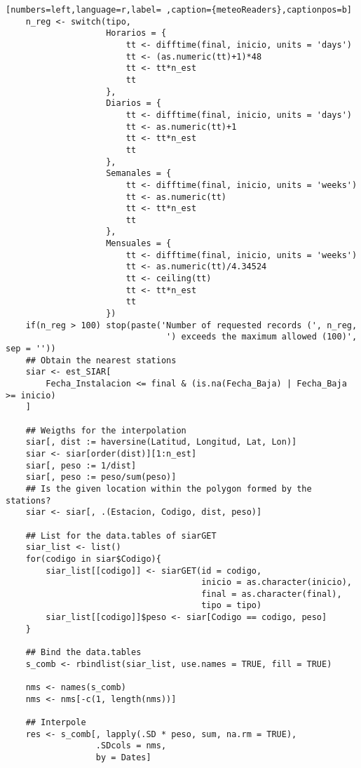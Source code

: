 \begin{lstlisting}[numbers=left,language=r,label= ,caption={meteoReaders},captionpos=b]
    n_reg <- switch(tipo,
                    Horarios = {
                        tt <- difftime(final, inicio, units = 'days')
                        tt <- (as.numeric(tt)+1)*48
                        tt <- tt*n_est
                        tt
                    },
                    Diarios = {
                        tt <- difftime(final, inicio, units = 'days')
                        tt <- as.numeric(tt)+1
                        tt <- tt*n_est
                        tt
                    },
                    Semanales = {
                        tt <- difftime(final, inicio, units = 'weeks')
                        tt <- as.numeric(tt)
                        tt <- tt*n_est
                        tt
                    },
                    Mensuales = {
                        tt <- difftime(final, inicio, units = 'weeks')
                        tt <- as.numeric(tt)/4.34524
                        tt <- ceiling(tt)
                        tt <- tt*n_est
                        tt
                    })
    if(n_reg > 100) stop(paste('Number of requested records (', n_reg,
                                ') exceeds the maximum allowed (100)', sep = ''))
    ## Obtain the nearest stations
    siar <- est_SIAR[
        Fecha_Instalacion <= final & (is.na(Fecha_Baja) | Fecha_Baja >= inicio)
    ]

    ## Weigths for the interpolation
    siar[, dist := haversine(Latitud, Longitud, Lat, Lon)]
    siar <- siar[order(dist)][1:n_est]
    siar[, peso := 1/dist]
    siar[, peso := peso/sum(peso)]
    ## Is the given location within the polygon formed by the stations?
    siar <- siar[, .(Estacion, Codigo, dist, peso)]

    ## List for the data.tables of siarGET
    siar_list <- list()
    for(codigo in siar$Codigo){
        siar_list[[codigo]] <- siarGET(id = codigo,
                                       inicio = as.character(inicio),
                                       final = as.character(final),
                                       tipo = tipo)
        siar_list[[codigo]]$peso <- siar[Codigo == codigo, peso]
    }

    ## Bind the data.tables
    s_comb <- rbindlist(siar_list, use.names = TRUE, fill = TRUE)

    nms <- names(s_comb)
    nms <- nms[-c(1, length(nms))]

    ## Interpole
    res <- s_comb[, lapply(.SD * peso, sum, na.rm = TRUE),
                  .SDcols = nms,
                  by = Dates]


\end{lstlisting}
